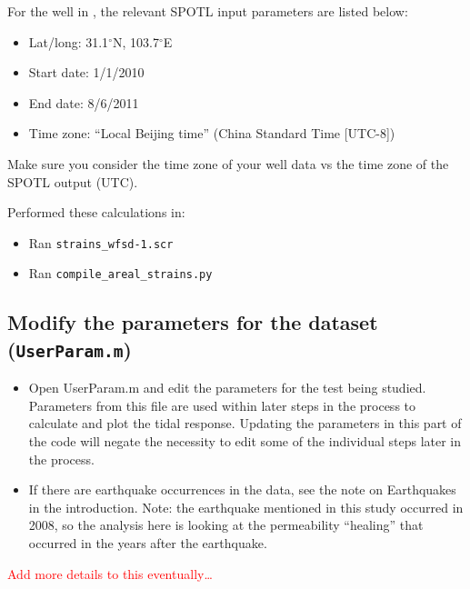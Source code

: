 \documentclass[11pt]{article}
\begin{document}
For the well in \citet{Xue2013}, the relevant SPOTL input parameters are listed
below:
\begin{itemize}
    \item Lat/long: 31.1$^\circ$N, 103.7$^\circ$E
    \item Start date: 1/1/2010
    \item End date: 8/6/2011
    \item Time zone: ``Local Beijing time'' (China Standard Time [UTC-8])
\end{itemize}

Make sure you consider the time zone of your well data vs the time zone of the
SPOTL output (UTC).

Performed these calculations in:
\begin{itemize}
\item Ran \texttt{strains\_wfsd-1.scr}
\item Ran \texttt{compile\_areal\_strains.py}
\end{itemize}

\subsection{Modify the parameters for the dataset (\texttt{UserParam.m})}

\begin{itemize}
    \item Open UserParam.m and edit the parameters for the test being studied.
        Parameters from this file are used within later steps in the process to
        calculate and plot the tidal response. Updating the parameters in this
        part of the code will negate the necessity to edit some of the
        individual steps later in the process.  
    \item If there are earthquake occurrences in the data, see the note on
        Earthquakes in the introduction. Note: the earthquake mentioned in this
        study occurred in 2008, so the analysis here is looking at the
        permeability ``healing'' that occurred in the years after the
        earthquake. 
\end{itemize}

\textcolor{red}{Add more details to this eventually\dots}


\end{document}
